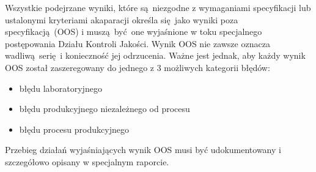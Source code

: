 Wszystkie podejrzane wyniki, które są niezgodne z wymaganiami specyfikacji lub ustalonymi kryteriami akaparacji określa się jako wyniki poza specyfikacją (OOS) i muszą być one wyjaśnione w toku specjalnego postępowania Działu Kontroli Jakości. Wynik OOS nie zawsze oznacza wadliwą serię i konieczność jej odrzucenia. Ważne jest jednak, aby każdy wynik OOS został zaszeregowany do jednego z 3 możliwych kategorii błędów:
\begin{itemize}
	\item błędu laboratoryjnego
	\item błędu produkcyjnego niezależnego od procesu
	\item błędu procesu produkcyjnego
\end{itemize}\vspace{\baselineskip}

Przebieg działań wyjaśniających wynik OOS musi być udokumentowany i szczegółowo opisany w specjalnym raporcie.
